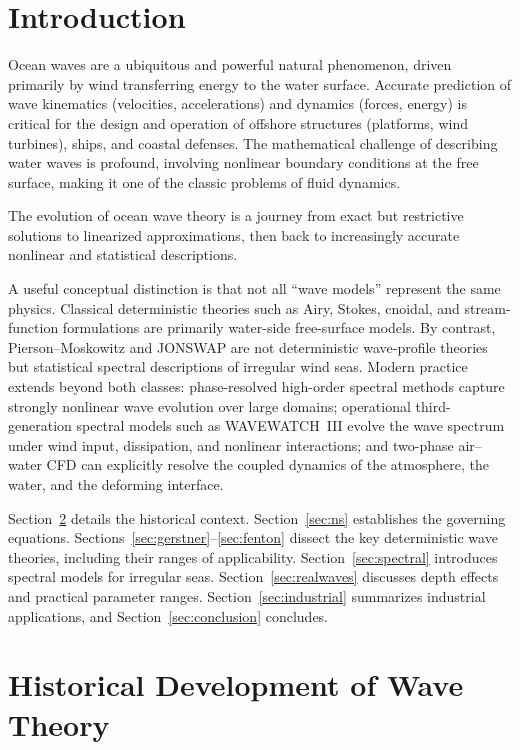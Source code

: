 \documentclass[journal,10pt,twocolumn]{IEEEtran}
\begin{document}
\section{Introduction}
\label{sec:intro}

Ocean waves are a ubiquitous and powerful natural phenomenon, driven primarily by wind
transferring energy to the water surface.
Accurate prediction of wave kinematics (velocities, accelerations) and dynamics (forces,
energy) is critical for the design and operation of offshore structures (platforms, wind
turbines), ships, and coastal defenses.
The mathematical challenge of describing water waves is profound, involving nonlinear
boundary conditions at the free surface, making it one of the classic problems of fluid
dynamics.

The evolution of ocean wave theory is a journey from exact but restrictive solutions to
linearized approximations, then back to increasingly accurate nonlinear and statistical
descriptions.

A useful conceptual distinction is that not all ``wave models'' represent the same
physics.
Classical deterministic theories such as Airy, Stokes, cnoidal, and stream-function
formulations are primarily water-side free-surface models.
By contrast, Pierson--Moskowitz and JONSWAP are not deterministic wave-profile theories
but statistical spectral descriptions of irregular wind seas.
Modern practice extends beyond both classes: phase-resolved high-order spectral methods
capture strongly nonlinear wave evolution over large domains; operational third-generation
spectral models such as WAVEWATCH~III evolve the wave spectrum under wind input,
dissipation, and nonlinear interactions; and two-phase air--water CFD can explicitly
resolve the coupled dynamics of the atmosphere, the water, and the deforming interface.

Section~\ref{sec:history} details the historical context.
Section~\ref{sec:ns} establishes the governing equations.
Sections~\ref{sec:gerstner}--\ref{sec:fenton} dissect the key deterministic wave
theories, including their ranges of applicability.
Section~\ref{sec:spectral} introduces spectral models for irregular seas.
Section~\ref{sec:realwaves} discusses depth effects and practical parameter ranges.
Section~\ref{sec:industrial} summarizes industrial applications, and
Section~\ref{sec:conclusion} concludes.

\section{Historical Development of Wave Theory}
\label{sec:history}
\end{document}
